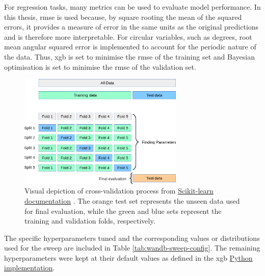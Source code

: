For regression tasks, many metrics can be used to evaluate model performance. In this thesis, \acrfull{rmse} is used because, by square rooting the mean of the squared errors, it provides a measure of error in the same units as the original predictions and is therefore more interpretable. For circular variables, such as degrees, root mean angular squared error is implemented to account for the periodic nature of the data. Thus, \acrshort{xgb} is set to minimise the \acrshort{rmse} of the training set and Bayesian optimisation is set to minimise the \acrshort{rmse} of the validation set.

\begin{figure}[h]
    \centering
    \includegraphics[width=0.7\textwidth]{../figures/static/grid_search_cross_validation.png}
    \caption{Visual depiction of cross-validation process from \href{https://scikit-learn.org/stable/modules/cross_validation.html}{Scikit-learn documentation} \citep{Pedregosa2011}. The orange test set represents the unseen data used for final evaluation, while the green and blue sets represent the training and validation folds, respectively.}
    \label{fig:cross_validation_process}
\end{figure}

The specific hyperparameters tuned and the corresponding values or distributions used for the sweep are included in Table \ref{tab:wandb-sweep-config}. The remaining hyperparameters were kept at their default values as defined in the \acrshort{xgb} \href{https://xgboost.readthedocs.io/en/stable/python/python_api.html\#module-xgboost.sklearn}{Python implementation}.

